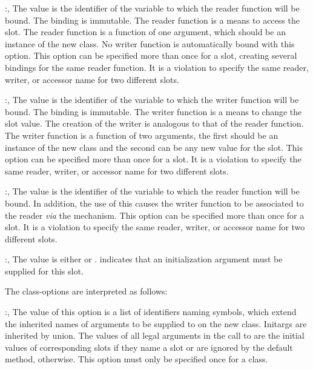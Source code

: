 \begin{optDefinition}
\begin{options}
    \item[\keyworddef{reader}:, \scref{identifier}]%
    The value is the identifier of the variable to which the reader function
    will be bound.  The binding is immutable.  The reader function is a means to
    access the slot.  The reader function is a function of one argument, which
    should be an instance of the new class.  No writer function is automatically
    bound with this option.  This option can be specified more than once for a
    slot, creating several bindings for the same reader function. It is a
    violation to specify the same reader, writer, or accessor name for two
    different slots.

    \item[\keyworddef{writer}:, \scref{identifier}]%
    The value is the identifier of the variable to which the writer function
    will be bound.  The binding is immutable.  The writer function is a means to
    change the slot value.  The creation of the writer is analogous to that of
    the reader function. The writer function is a function of two arguments, the
    first should be an instance of the new class and the second can be any new
    value for the slot.  This option can be specified more than once for a slot.
    It is a violation to specify the same reader, writer, or accessor name
    for two different slots.

    \item[\keyworddef{accessor}:, \scref{identifier}]%
    The value is the identifier of the variable to which the reader function
    will be bound. In addition, the use of this  causes the
    writer function to be associated to the reader {\em via\/} the
     mechanism. This option can be specified more than once
    for a slot. It is a violation to specify the same reader, writer, or
    accessor name for two different slots.

    \item[\keyworddef{requiredp}:, \scref{boolean}]%
    The value is either \true{} or \nil{}. \true{} indicates that an
    initialization argument must be supplied for this slot.
\end{options}
%
The class-options are interpreted as follows:
%
\begin{options}
    \item[\keyworddef{keywords}:, \scref{list}]%
    The value of this option is a list of identifiers naming symbols, which
    extend the inherited names of arguments to be supplied to 
    on the new class.  Initargs are inherited by union. The values of all legal
    arguments in the call to  are the initial values of
    corresponding slots if they name a slot  or are ignored by
    the default  method, otherwise. This option
    must only be specified once for a class.


\end{options}
\end{optDefinition}
